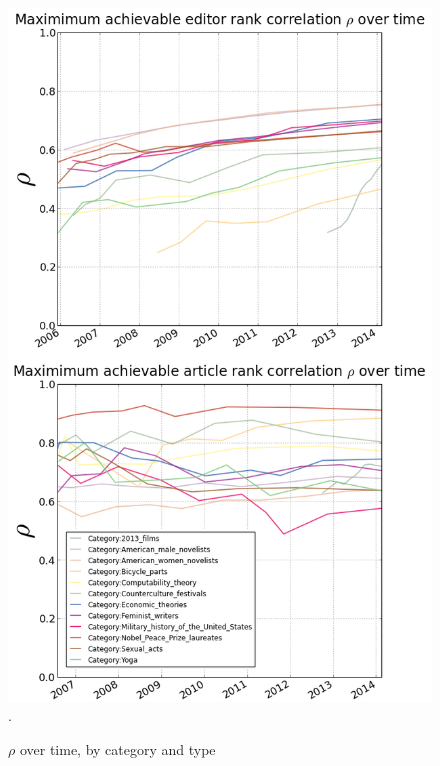 \documentclass{acm_proc_article-sp}
\begin{document}
\begin{figure}[!t]
\centering
\includegraphics[width=0.9\columnwidth]{rho_combined.png}.
\caption{$\rho$ over time, by category and type}
\label{fig:rhotime}
\end{figure}



\end{document}
